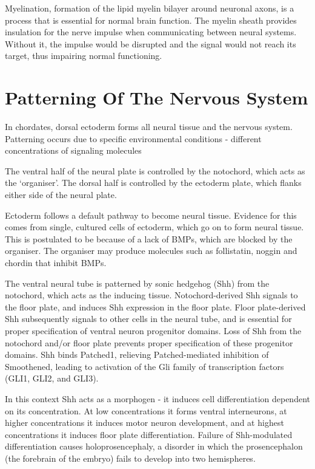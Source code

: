 Myelination, formation of the lipid myelin bilayer around neuronal axons, is a process that is essential for normal brain function. The myelin sheath provides insulation for the nerve impulse when communicating between neural systems. Without it, the impulse would be disrupted and the signal would not reach its target, thus impairing normal functioning.

\hypertarget{patterning-of-the-nervous-system}{%
\section{Patterning Of The Nervous System}\label{patterning-of-the-nervous-system}}

In chordates, dorsal ectoderm forms all neural tissue and the nervous system. Patterning occurs due to specific environmental conditions - different concentrations of signaling molecules

The ventral half of the neural plate is controlled by the notochord, which acts as the `organiser'. The dorsal half is controlled by the ectoderm plate, which flanks either side of the neural plate.

Ectoderm follows a default pathway to become neural tissue. Evidence for this comes from single, cultured cells of ectoderm, which go on to form neural tissue. This is postulated to be because of a lack of BMPs, which are blocked by the organiser. The organiser may produce molecules such as follistatin, noggin and chordin that inhibit BMPs.

The ventral neural tube is patterned by sonic hedgehog (Shh) from the notochord, which acts as the inducing tissue. Notochord-derived Shh signals to the floor plate, and induces Shh expression in the floor plate. Floor plate-derived Shh subsequently signals to other cells in the neural tube, and is essential for proper specification of ventral neuron progenitor domains. Loss of Shh from the notochord and/or floor plate prevents proper specification of these progenitor domains. Shh binds Patched1, relieving Patched-mediated inhibition of Smoothened, leading to activation of the Gli family of transcription factors (GLI1, GLI2, and GLI3).

In this context Shh acts as a morphogen - it induces cell differentiation dependent on its concentration. At low concentrations it forms ventral interneurons, at higher concentrations it induces motor neuron development, and at highest concentrations it induces floor plate differentiation. Failure of Shh-modulated differentiation causes holoprosencephaly, a disorder in which the prosencephalon (the forebrain of the embryo) fails to develop into two hemispheres.

